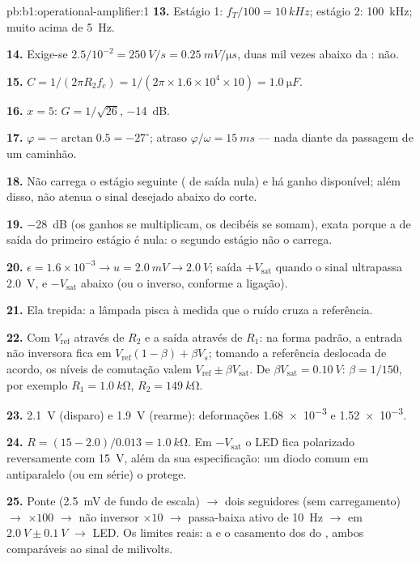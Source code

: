 \begin{solution}{pb:b1:operational-amplifier:1}
\textbf{13.} Estágio 1: $f_T/100 = \qty{10}{kHz}$; estágio 2: \qty{100}{kHz};
muito acima de \qty{5}{Hz}.

\textbf{14.} Exige-se $2.5/10^{-2} = \qty{250}{V/s} = \qty{0.25}{mV/\micro s}$,
duas mil vezes abaixo da : não.

\textbf{15.} $C = 1/(2\pi R_2f_c) = 1/(2\pi \times 1.6\times10^4 \times 10)
= \qty{1.0}{\micro F}$.

\textbf{16.} $x = 5$: $G = 1/\sqrt{26}$, \qty{-14}{dB}.

\textbf{17.} $\varphi = -\arctan 0.5 = -27^\circ$; atraso $\varphi/\omega =
\qty{15}{ms}$ --- nada diante da passagem de um caminhão.

\textbf{18.} Não carrega o estágio seguinte ( de saída nula)
e há ganho disponível; além disso, não atenua o sinal desejado abaixo do
corte.

\textbf{19.} \qty{-28}{dB} (os ganhos se multiplicam, os decibéis se somam), exata porque
a  de saída do primeiro estágio é nula: o segundo estágio não o
carrega.

\textbf{20.} $\epsilon = 1.6\times10^{-3} \to u = \qty{2.0}{mV} \to
\qty{2.0}{V}$; saída $+V_{\mathrm{sat}}$ quando o sinal ultrapassa
\qty{2.0}{V}, e $-V_{\mathrm{sat}}$ abaixo (ou o inverso, conforme a ligação).

\textbf{21.} Ela trepida: a lâmpada pisca à medida que o ruído cruza a
referência.

\textbf{22.} Com $V_{\mathrm{ref}}$ através de $R_2$ e a saída através de
$R_1$: na forma padrão, a entrada não inversora fica em
$V_{\mathrm{ref}}(1 - \beta) + \beta V_s$; tomando a referência deslocada
de acordo, os níveis de comutação valem $V_{\mathrm{ref}} \pm \beta V_{\mathrm{sat}}$.
De $\beta V_{\mathrm{sat}} = \qty{0.10}{V}$: $\beta = 1/150$, por exemplo $R_1 =
\qty{1.0}{k\ohm}$, $R_2 = \qty{149}{k\ohm}$.

\textbf{23.} \qty{2.1}{V} (disparo) e \qty{1.9}{V} (rearme): deformações
\num{1.68e-3} e \num{1.52e-3}.

\textbf{24.} $R = (15 - 2.0)/0.013 = \qty{1.0}{k\ohm}$. Em
$-V_{\mathrm{sat}}$ o LED fica polarizado reversamente com \qty{15}{V}, além da sua
especificação: um diodo comum em antiparalelo (ou em série) o protege.

\textbf{25.} Ponte (\qty{2.5}{mV} de fundo de escala) $\to$ dois seguidores (sem
carregamento) $\to$  $\times100$ $\to$ não inversor
$\times10$ $\to$ passa-baixa ativo de \qty{10}{Hz} $\to$  em
$\qty{2.0}{V} \pm \qty{0.1}{V}$ $\to$ LED. Os limites reais: a  e o casamento dos  do , ambos comparáveis ao sinal de milivolts.
\end{solution}
